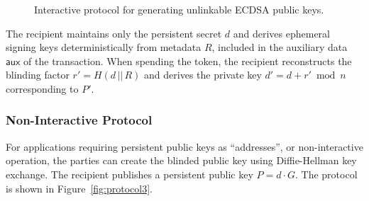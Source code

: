 \documentclass{article}
\newcommand{\auxd}[0]{\mathsf{aux}}
\begin{document}
\begin{figure}[!htb]
\centering
{}
\caption{Interactive protocol for generating unlinkable ECDSA public keys.}
\label{fig:protocol1}
\end{figure}

The recipient maintains only the persistent secret $d$ and derives ephemeral signing keys deterministically from metadata $R$, included in the auxiliary data $\auxd$ of the transaction. When spending the token, the recipient reconstructs the blinding factor $r' = H(d \,||\, R)$ and derives the private key $d' = d + r' \bmod n$ corresponding to $P'$.

\subsubsection{Non-Interactive Protocol}

For applications requiring persistent public keys as ``addresses'', or non-interactive operation, the parties can create the blinded public key using Diffie-Hellman key exchange. The recipient publishes a persistent public key $P = d \cdot G$. The protocol is shown in Figure~\ref{fig:protocol3}.
\end{document}
